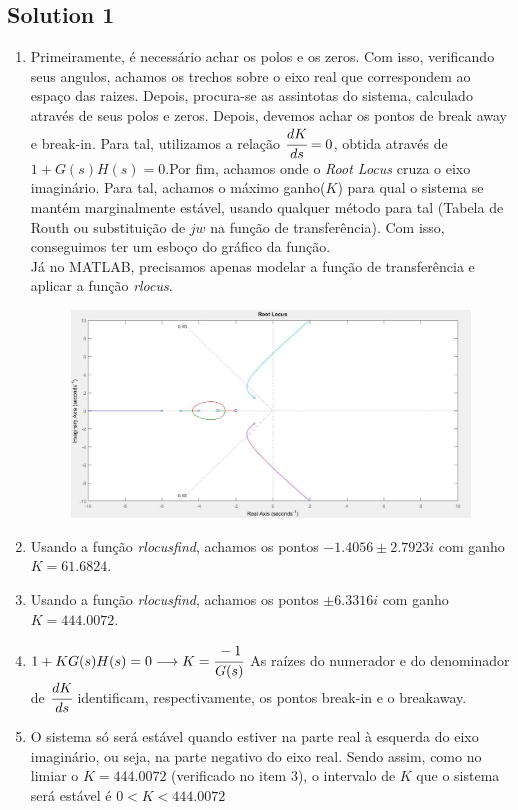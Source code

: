 \documentclass[a4paper,11pt]{article}
\begin{document}
\subsection*{Solution 1}
\begin{enumerate}
	\item Primeiramente, é necessário achar os polos e os zeros. Com isso, verificando seus angulos, achamos os trechos sobre o eixo real que correspondem ao espaço das raizes. Depois, procura-se as assintotas do sistema, calculado através de seus polos e zeros. Depois, devemos achar os pontos de break away e break-in. Para tal, utilizamos a relação $\cfrac{dK}{ds}=0$, obtida através de $1+G(s)H(s)=0$.Por fim, achamos onde o \textit{Root Locus} cruza o eixo imaginário. Para tal, achamos o máximo ganho($K$) para qual o sistema se mantém marginalmente estável, usando qualquer método para tal (Tabela de Routh ou substituição de $jw$ na função de transferência). Com isso, conseguimos ter um esboço do gráfico da função.\\
	Já no MATLAB, precisamos apenas modelar a função de transferência e aplicar a função \textit{rlocus}.
	
	\begin{figure}[!h]  \includegraphics [scale=0.45] {Figures/exercise1-1} \end{figure}
	
	\item Usando a função \textit{rlocusfind}, achamos os pontos $-1.4056 \pm 2.7923i$ com ganho $K = 61.6824$.
	\item Usando a função \textit{rlocusfind}, achamos os pontos $\pm6.3316i$ com ganho $K = 444.0072$.
	\item $1+KG(s)H(s)=0 \longrightarrow K = \cfrac{-1}{G(s)}$
	\vskip0.4cm
	As raízes do numerador e do denominador de $\cfrac{dK}{ds}$ identificam, respectivamente, os pontos break-in e o breakaway.
	\vskip0.4cm
	\item O sistema só será estável quando estiver na parte real à esquerda do eixo imaginário, ou seja, na parte negativo do eixo real. Sendo assim, como no limiar o $K=444.0072$ (verificado no item 3), o intervalo de $K$ que o sistema será estável é $0<K<444.0072$ 
\end{enumerate}
\end{document}
